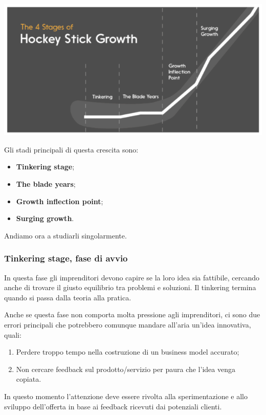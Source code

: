\documentclass[14pt]{extarticle}
\begin{document}
\begin{center}
    \includegraphics[scale=0.80]{images/hockey_stick.png}
\end{center}
Gli stadi principali di questa crescita sono:
\begin{itemize}
    \item \textbf{Tinkering stage};
    \item \textbf{The blade years};
    \item \textbf{Growth inflection point};
    \item \textbf{Surging growth}.   
\end{itemize}
Andiamo ora a studiarli singolarmente.

\newpage
\subsubsection{Tinkering stage, fase di avvio}

In questa fase gli imprenditori devono capire se la loro idea sia fattibile,
cercando anche di trovare il giusto equilibrio tra problemi e soluzioni. Il
tinkering termina quando si passa dalla teoria alla pratica.

Anche se questa fase non comporta molta pressione agli imprenditori, ci sono due
errori principali che potrebbero comunque mandare all'aria un'idea innovativa,
quali:

\begin{enumerate}
    \item Perdere troppo tempo nella costruzione di un business model accurato;
    \item Non cercare feedback sul prodotto/servizio per paura che l'idea venga
    copiata. 
\end{enumerate}
In questo momento l'attenzione deve essere rivolta alla sperimentazione e allo
sviluppo dell'offerta in base ai feedback ricevuti dai potenziali clienti.
\end{document}
